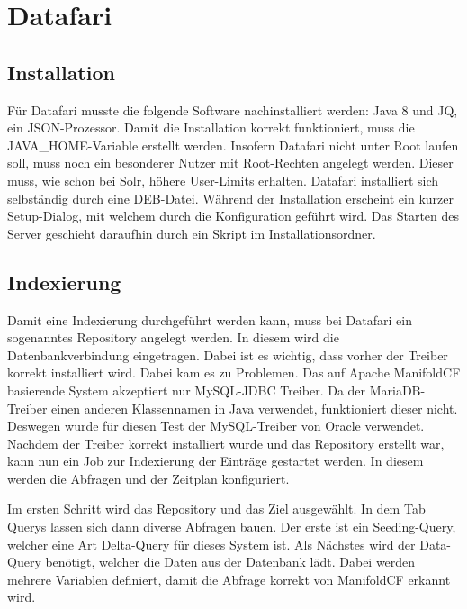 
\section{Datafari}

\subsection{Installation}

Für Datafari musste die folgende Software nachinstalliert werden: Java 8 und JQ, ein JSON-Prozessor. Damit die Installation korrekt funktioniert, muss die JAVA\_HOME-Variable erstellt werden. Insofern Datafari nicht unter Root laufen soll, muss noch ein besonderer Nutzer mit Root-Rechten angelegt werden. Dieser muss, wie schon bei Solr, höhere User-Limits erhalten. Datafari installiert sich selbständig durch eine DEB-Datei. Während der Installation erscheint ein kurzer Setup-Dialog, mit welchem durch die Konfiguration geführt wird. Das Starten des Server geschieht daraufhin durch ein Skript im Installationsordner.

\subsection{Indexierung}

Damit eine Indexierung durchgeführt werden kann, muss bei Datafari ein sogenanntes Repository angelegt werden. In diesem wird die Datenbankverbindung eingetragen. Dabei ist es wichtig, dass vorher der Treiber korrekt installiert wird. Dabei kam es zu Problemen.
Das auf Apache ManifoldCF basierende System akzeptiert nur MySQL-JDBC Treiber. Da der MariaDB-Treiber einen anderen Klassennamen in Java verwendet, funktioniert dieser nicht. \cite[S.~61]{ApacheSoftwareFoundation.} Deswegen wurde für diesen Test der MySQL-Treiber von Oracle verwendet.
Nachdem der Treiber korrekt installiert wurde und das Repository erstellt war, kann nun ein Job zur Indexierung der Einträge gestartet werden. In diesem werden die Abfragen und der Zeitplan konfiguriert.

Im ersten Schritt wird das Repository und das Ziel ausgewählt. In dem Tab Querys lassen sich dann diverse Abfragen bauen. Der erste ist ein Seeding-Query, welcher eine Art Delta-Query für dieses System ist. Als Nächstes wird der Data-Query benötigt, welcher die Daten aus der Datenbank lädt. Dabei werden mehrere Variablen definiert, damit die Abfrage korrekt von ManifoldCF erkannt wird. 

